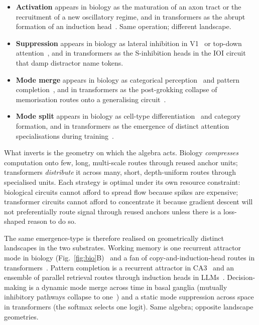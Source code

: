 \documentclass[11pt,a4paper]{article}
\begin{document}
\begin{itemize}[leftmargin=*]
\item \textbf{Activation} appears in biology as the maturation of an
axon tract or the recruitment of a new oscillatory regime, and in
transformers as the abrupt formation of an induction
head~\cite{olsson2022induction}. Same operation; different
landscape.
\item \textbf{Suppression} appears in biology as lateral inhibition
in V1~\cite{hubel1962} or top-down attention~\cite{desimone1995neural},
and in transformers as the S-inhibition heads in the IOI
circuit~\cite{wang2022interpretability} that damp distractor name
tokens.
\item \textbf{Mode merge} appears in biology as categorical
perception~\cite{liberman1957discrimination} and pattern
completion~\cite{marr1971,treves1994}, and in transformers as the
post-grokking collapse of memorisation routes onto a generalising
circuit~\cite{nanda2023grokking}.
\item \textbf{Mode split} appears in biology as cell-type
differentiation~\cite{waddington1957strategy} and category formation,
and in transformers as the emergence of distinct attention
specialisations during training~\cite{voita2019analyzing}.
\end{itemize}

What inverts is the geometry on which the algebra acts. Biology
\emph{compresses} computation onto few, long, multi-scale routes
through reused anchor units; transformers \emph{distribute} it
across many, short, depth-uniform routes through specialised units.
Each strategy is optimal under its own resource constraint:
biological circuits cannot afford to spread flow because spikes are
expensive; transformer circuits cannot afford to concentrate it
because gradient descent will not preferentially route signal through
reused anchors unless there is a loss-shaped reason to do so.

The same emergence-type is therefore realised on geometrically
distinct landscapes in the two substrates. Working memory is one
recurrent attractor mode in biology
(Fig.~\ref{fig:bio}B)~\cite{goldmanrakic1995,constantinidis2018workingmemory}
and a fan of copy-and-induction-head routes in
transformers~\cite{olsson2022induction}. Pattern completion is a
recurrent attractor in
CA3~\cite{marr1971,treves1994,leutgeb2007pattern} and an ensemble of
parallel retrieval routes through induction heads in
LLMs~\cite{olsson2022induction}. Decision-making is a dynamic mode
merge across time in basal ganglia (mutually inhibitory pathways
collapse to one~\cite{frank2006bg}) and a static mode suppression
across space in transformers (the softmax selects one logit). Same
algebra; opposite landscape geometries.
\end{document}
